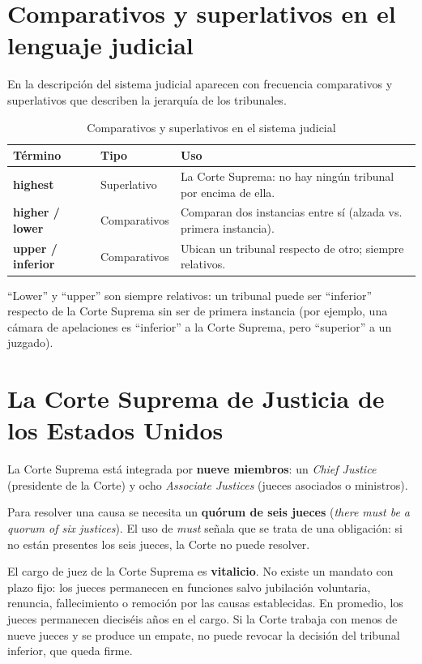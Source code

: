 \documentclass[12pt,oneside]{book}
\begin{document}
\section{Comparativos y superlativos en el lenguaje judicial}

En la descripción del sistema judicial aparecen con frecuencia comparativos y superlativos que describen la jerarquía de los tribunales.

\begin{table}[H]
\centering
\caption{Comparativos y superlativos en el sistema judicial}
\begin{tabularx}{\textwidth}{>{\raggedright\arraybackslash}p{} >{\raggedright\arraybackslash}p{} >{\raggedright\arraybackslash}X}
\toprule
\textbf{Término} & \textbf{Tipo} & \textbf{Uso} \\
\midrule
\textbf{highest} & Superlativo & La Corte Suprema: no hay ningún tribunal por encima de ella. \\
\textbf{higher / lower} & Comparativos & Comparan dos instancias entre sí (alzada vs. primera instancia). \\
\textbf{upper / inferior} & Comparativos & Ubican un tribunal respecto de otro; siempre relativos. \\
\bottomrule
\end{tabularx}
\end{table}

``Lower'' y ``upper'' son siempre relativos: un tribunal puede ser ``inferior'' respecto de la Corte Suprema sin ser de primera instancia (por ejemplo, una cámara de apelaciones es ``inferior'' a la Corte Suprema, pero ``superior'' a un juzgado).

\section{La Corte Suprema de Justicia de los Estados Unidos}

La Corte Suprema está integrada por \textbf{nueve miembros}: un \textit{Chief Justice} (presidente de la Corte) y ocho \textit{Associate Justices} (jueces asociados o ministros).

Para resolver una causa se necesita un \textbf{quórum de seis jueces} (\textit{there must be a quorum of six justices}). El uso de \textit{must} señala que se trata de una obligación: si no están presentes los seis jueces, la Corte no puede resolver.

\begin{important}
El cargo de juez de la Corte Suprema es \textbf{vitalicio}. No existe un mandato con plazo fijo: los jueces permanecen en funciones salvo jubilación voluntaria, renuncia, fallecimiento o remoción por las causas establecidas. En promedio, los jueces permanecen dieciséis años en el cargo. Si la Corte trabaja con menos de nueve jueces y se produce un empate, no puede revocar la decisión del tribunal inferior, que queda firme.
\end{important}
\end{document}
